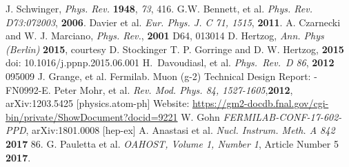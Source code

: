 \documentclass[journal,article,submit,moreauthors,pdftex,10pt,a4paper]{Definitions/mdpi}
\begin{document}




\begin{thebibliography}{999}
J. Schwinger, {\em Phys. Rev.} {\bf 1948}, {\em 73}, 416.
G.W. Bennett, et al. {\em Phys. Rev. D73:072003}, {\bf 2006}.
Davier et al. {\em Eur. Phys. J. C 71, 1515}, {\bf 2011}.
A. Czarnecki and W. J. Marciano, {\em Phys. Rev.}, {\bf 2001} D64, 013014
D. Hertzog, {\em Ann. Phys (Berlin)} {\bf 2015}, courtesy D. Stockinger
T. P. Gorringe and D. W. Hertzog, {\bf 2015} doi: 10.1016/j.ppnp.2015.06.001
 H.~Davoudiasl, et al. {\em Phys.\ Rev.\ D} {\em 86}, {\bf 2012} 095009
J. Grange, et al. Fermilab. Muon (g-2) Technical Design Report: -FN0992-E.
Peter Mohr, et al. {\em Rev. Mod. Phys. 84, 1527-1605},{\bf 2012}, arXiv:1203.5425 [physics.atom-ph]
Website: \url{https://gm2-docdb.fnal.gov/cgi-bin/private/ShowDocument?docid=9221}
W. Gohn {\em FERMILAB-CONF-17-602-PPD}, arXiv:1801.0008 [hep-ex] 
A. Anastasi et al. {\em Nucl. Instrum. Meth. A 842} {\bf 2017} 86.
G. Pauletta et al. {\em OAHOST, Volume 1, Number 1}, Article Number 5 {\bf 2017}.
\end{thebibliography}
\end{document}
